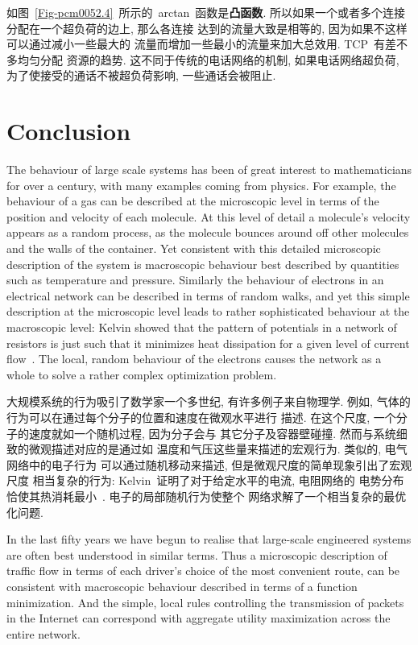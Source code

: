 \documentclass[a4paper,12pt, twocolumn]{article}
\begin{document}
如图~\ref{Fig-pcm0052.4}~所示的~arctan~函数是\textbf{凸函数}. 
所以如果一个或者多个连接分配在一个超负荷的边上, 那么各连接
达到的流量大致是相等的, 因为如果不这样可以通过减小一些最大的
流量而增加一些最小的流量来加大总效用. TCP~有差不多均匀分配
资源的趋势. 这不同于传统的电话网络的机制, 如果电话网络超负荷, 
为了使接受的通话不被超负荷影响, 一些通话会被阻止. 

\section{Conclusion}

The behaviour of large scale systems has been of great interest to
mathematicians for over a century, with many examples coming from
physics. For example, 
the behaviour of a gas can be described at the microscopic
level in terms of the position and velocity of each molecule. At this
level of detail a
molecule's velocity appears as a random process, as 
the molecule bounces around off other molecules and the
walls of the 
container.
Yet consistent with this detailed microscopic description of the system 
is macroscopic behaviour best described by quantities such as
temperature and pressure.  
Similarly the behaviour of electrons in an
electrical network can be described in terms of random walks, and yet
this simple description at the microscopic level leads to rather
sophisticated behaviour at the macroscopic level: Kelvin
showed that the pattern of
potentials in a network of resistors is just such that it minimizes
heat dissipation for a given level of current flow~\cite{K91}.
The local, random behaviour of the electrons causes the network
as a whole to solve a rather complex optimization problem.

大规模系统的行为吸引了数学家一个多世纪, 有许多例子来自物理学. 
例如, 气体的行为可以在通过每个分子的位置和速度在微观水平进行
描述. 在这个尺度, 一个分子的速度就如一个随机过程, 因为分子会与
其它分子及容器壁碰撞. 然而与系统细致的微观描述对应的是通过如
温度和气压这些量来描述的宏观行为. 类似的, 电气网络中的电子行为
可以通过随机移动来描述, 但是微观尺度的简单现象引出了宏观尺度
相当复杂的行为: Kelvin~证明了对于给定水平的电流, 电阻网络的
电势分布恰使其热消耗最小~\cite{K91}. 电子的局部随机行为使整个
网络求解了一个相当复杂的最优化问题. 

In the last fifty years we have begun to realise
that large-scale engineered systems are often best understood in
similar terms. Thus a microscopic description of 
traffic flow in terms of each driver's
choice of the most convenient route, can 
be consistent with macroscopic
behaviour described in terms of a function minimization.
And the simple, local rules controlling 
the transmission of packets in the Internet can correspond
with aggregate utility maximization across the entire network. 
\end{document}
